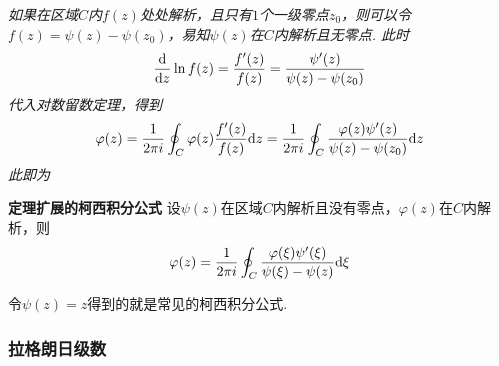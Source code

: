 \documentclass[UTF8]{ctexart}
\newcommand{\trm}[1]{{\rm #1}}
\newenvironment{theorem}[1]
    {\begin{tcolorbox}[enhanced, colback=LightYellow, breakable=true, frame hidden, borderline west={1.5mm}{-2mm}{DarkBlue}]
    {\bfseries {\color{DarkBlue} 定理}\quad #1} \newline}
    {\end{tcolorbox}}
\begin{document}
\vspace{1cm}

\textit{
如果在区域\(C\)内\(f(z)\)处处解析，且只有\(1\)个一级零点\(z_0\)，则可以令\(f(z)=\psi(z)-\psi(z_0)\)，易知\(\psi(z)\)在\(C\)内解析且无零点. 此时
\[\frac{\trm{d}}{\trm{d}z}\ln f(z) = \frac{f'(z)}{f(z)}=\frac{\psi'(z)}{\psi(z)-\psi(z_0)}\]
代入对数留数定理，得到
\[\varphi(z) = \frac{1}{2\pi i}\oint_C \varphi(z)\frac{f'(z)}{f(z)}\trm{d}z = \frac{1}{2\pi i}\oint_C\frac{\varphi(z)\psi'(z)}{\psi(z)-\psi(z_0)}\trm{d}z\]
此即为
}
\begin{theorem}{扩展的柯西积分公式}
    设\(\psi(z)\)在区域\(C\)内解析且没有零点，\(\varphi(z)\)在\(C\)内解析，则
    \[\varphi(z)=\frac{1}{2 \pi i}\oint_C\frac{\varphi(\xi)\psi'(\xi)}{\psi(\xi)-\psi(z)}\trm{d}\xi\]
\end{theorem}
令\(\psi(z)=z\)得到的就是常见的柯西积分公式.

\subsubsection{拉格朗日级数}
\end{document}
